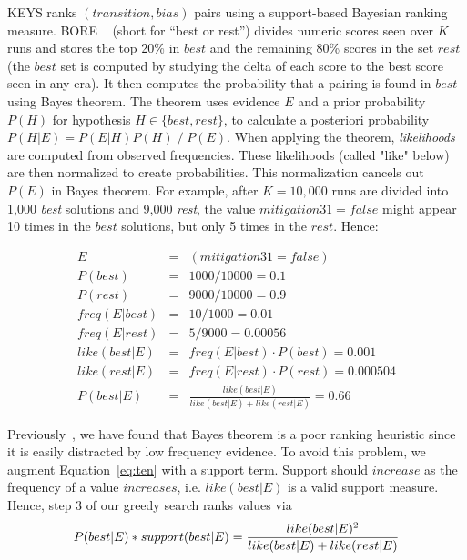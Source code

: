 \documentclass{sig-alternate}
\newcounter{over}
\newcommand{\eq}[1]{Equation~\ref{eq:#1}}
\begin{document}
KEYS ranks $(transition,bias)$ pairs using a support-based
Bayesian ranking measure.
BORE ~\cite{clark05} (short for ``best or rest'')
divides numeric scores seen over $K$ runs and stores the top 20\%  in $best$ and the remaining 80\% scores in the set $rest$
(the $best$ set is computed by studying the delta
of each score 
to the best score seen in any era).
It then computes the probability that a pairing is found in $best$
using
Bayes theorem.
The theorem uses
evidence $E$ and a prior probability $P(H)$ for
hypothesis $H\in\{best, rest\}$,
to calculate a  posteriori  probability
$P(H|E)=P(E|H) P(H)\; /\; P(E)$.
When applying the theorem, {\em likelihoods}
are computed from observed
frequencies. These likelihoods (called "like" below) are then normalized to create
probabilities. This normalization cancels out $P(E)$ in Bayes theorem.
For example, after $K=10,000$ runs are divided into  1,000 {\em best} solutions and 9,000
{\em rest}, the  value \mbox{$mitigation31=false$} might appear 10 times in the $best$ solutions, but only
5 times in the $rest$. Hence:\newline
\begin{minipage}{1.0\linewidth}
{\scriptsize
\begin{eqnarray}\nonumber
E&=& (mitigation31=false)\\\nonumber
P(best)&=&1000/10000 = 0.1\\\nonumber
P(rest)&=&9000/10000 = 0.9\\\nonumber
freq(E|best)&=&10/1000 = 0.01\\\nonumber
freq(E|rest)&=&5/9000 = 0.00056\\\nonumber
like(best|E)&=&freq(E|best) \cdot P(best)=0.001\\\nonumber
like(rest|E)&=&freq(E|rest) \cdot P(rest)= 0.000504\\\label{eq:ten}
P(best|E)&=& \frac{like(best|E)}{like(best|E) + like(rest|E)}=0.66
\end{eqnarray}}
\end{minipage}\newline

Previously~\cite{clark05},
we have found that  Bayes theorem
is a poor ranking heuristic
since it is easily distracted by low frequency evidence.
To avoid this problem, we augment \eq{ten}
with a support term.
Support should $increase$ as the frequency of a value $increases$,  i.e. 
$like(best|E)$ is a valid support measure.
 Hence, step 3 of our greedy search ranks values  via
\begin{equation}\label{eq:ps3}\small
P(best|E) * support(best|E) = \frac{like(best|E)^2}{like(best|E) + like(rest|E)}
\end{equation}
\end{document}
